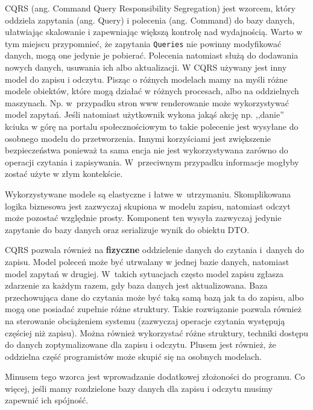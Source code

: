 CQRS (ang. Command Query Responsibility Segregation) jest wzorcem, który oddziela zapytania (ang. Query) i polecenia (ang. Command) do bazy danych, ułatwiając skalowanie i zapewniając większą kontrolę nad wydajnością. Warto w tym miejscu przypomnieć, że zapytania \texttt{Queries} nie powinny modyfikować danych, mogą one jedynie je pobierać. Polecenia natomiast służą do dodawania nowych danych, usuwania ich albo aktualizacji. W CQRS używany jest inny model do zapisu i odczytu. Pisząc o różnych modelach mamy na myśli różne modele obiektów, które mogą działać w różnych procesach, albo na oddzielnych maszynach. Np. w~przypadku stron www renderowanie może wykorzystywać model zapytań. Jeśli natomiast użytkownik wykona jakąś akcję np. ,,danie'' kciuka w górę na portalu społecznościowym to takie polecenie jest wysyłane do osobnego modelu do przetworzenia. Innymi korzyściami jest zwiększenie bezpieczeństwa ponieważ ta sama encja nie jest wykorzystywana zarówno do operacji czytania i zapisywania. W~przeciwnym przypadku informacje mogłyby zostać użyte w złym kontekście. 

Wykorzystywane modele są elastyczne i łatwe w~utrzymaniu. Skomplikowana logika biznesowa jest zazwyczaj skupiona w modelu zapisu, natomiast odczyt może pozostać względnie prosty. Komponent ten wysyła zazwyczaj jedynie zapytanie do bazy danych oraz serializuje wynik do obiektu DTO.

CQRS pozwala również na \textbf{fizyczne} oddzielenie danych do czytania i~danych do zapisu. Model poleceń może być utrwalany w jednej bazie danych, natomiast model zapytań w drugiej.  W~takich sytuacjach często model zapisu zgłasza zdarzenie za każdym razem, gdy baza danych jest aktualizowana. Baza przechowująca dane do czytania może być taką samą bazą jak ta do zapisu, albo mogą one posiadać zupełnie różne struktury. Takie rozwiązanie pozwala również na sterowanie obciążeniem systemu (zazwyczaj operacje czytania występują częściej niż zapisu). Można również wykorzystać różne struktury, techniki dostępu do danych zoptymalizowane dla zapisu i odczytu. Plusem jest również, że oddzielna część programistów może skupić się na osobnych modelach.


Minusem tego wzorca jest wprowadzanie dodatkowej złożoności do programu. Co więcej, jeśli mamy rozdzielone bazy danych dla zapisu i odczytu musimy zapewnić ich spójność.

